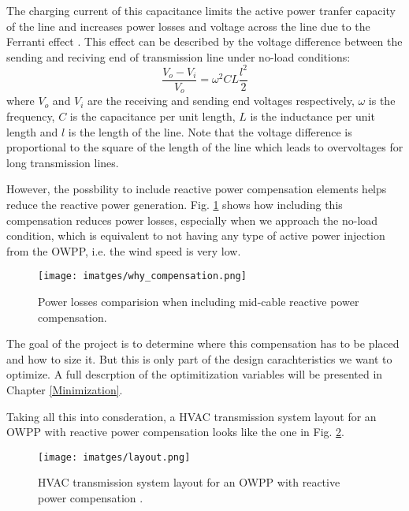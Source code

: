 \documentclass[a4paper,11pt, titlepage, twoside]{article}
\begin{document}
The charging current of this capacitance limits the active power tranfer capacity of the line and increases
power losses and voltage across the line due to the Ferranti effect \cite{ferranti}. This effect can be described by the voltage difference between the sending and reciving end of transmission line under no-load conditions:
\begin{equation}
    \frac{V_{o} - V_{i}}{V_{o}} = \omega^2CL\frac{l^2}{2}
\end{equation}
where $V_{o}$ and $V_{i}$ are the receiving and sending end voltages respectively, $\omega$ is the frequency, $C$ is the capacitance per unit length, $L$ is the inductance per unit length and $l$ is the length of the line. Note that the voltage difference is
proportional to the square of the length of the line which leads to overvoltages for long transmission lines.\par

However, the possbility to include reactive power compensation elements helps reduce the reactive power generation. Fig. \ref{fig:whycomp} shows how including
this compensation reduces power losses, especially when we approach the no-load condition, which is equivalent to not having any type of active power injection from
the OWPP, i.e. the wind speed is very low.
\begin{figure}[h] %
	\centering
	\texttt{[image: imatges/why\_compensation.png]}
	\caption{Power losses comparision when including mid-cable reactive power compensation.}
	\label{fig:whycomp} %
\end{figure}

The goal of the project is to determine where this compensation has to be placed  and how to size it. But this is only part of the design carachteristics we want to optimize. A full descrption of the optimitization variables will be
presented in Chapter \ref{Minimization}.

Taking all this into consderation, a HVAC transmission system layout for an OWPP with reactive power compensation looks like the one in Fig. \ref{fig:fulltransmission}.
\begin{figure}[H] %
    \centering
    \texttt{[image: imatges/layout.png]}
    \caption{HVAC transmission system layout for an OWPP with reactive power compensation \cite{paperbase}.}
    \label{fig:fulltransmission} %
\end{figure}
\end{document}
